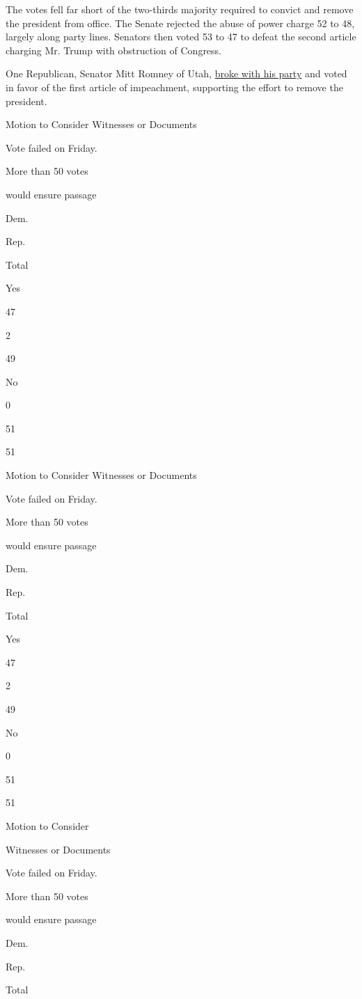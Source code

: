The votes fell far short of the two-thirds majority required to convict
and remove the president from office. The Senate rejected the abuse of
power charge 52 to 48, largely along party lines. Senators then voted 53
to 47 to defeat the second article charging Mr. Trump with obstruction
of Congress.

One Republican, Senator Mitt Romney of Utah,
\href{https://www.nytimes3xbfgragh.onion/2020/02/05/us/politics/trump-acquitted-impeachment.html}{broke
with his party} and voted in favor of the first article of impeachment,
supporting the effort to remove the president.

Motion to Consider Witnesses or Documents

Vote failed on Friday.

More than 50 votes

would ensure passage

Dem.

Rep.

Total

Yes

47

2

49

No

0

51

51

Motion to Consider Witnesses or Documents

Vote failed on Friday.

More than 50 votes

would ensure passage

Dem.

Rep.

Total

Yes

47

2

49

No

0

51

51

Motion to Consider

Witnesses or Documents

Vote failed on Friday.

More than 50 votes

would ensure passage

Dem.

Rep.

Total

